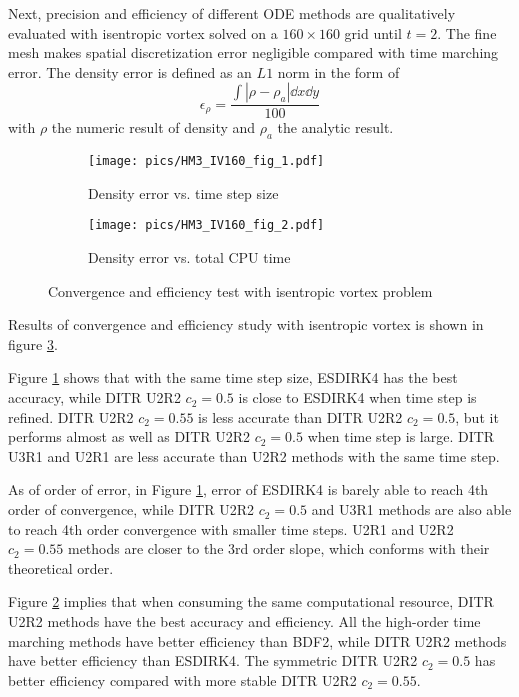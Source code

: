 Next, precision and efficiency of different ODE methods are
qualitatively evaluated with isentropic vortex solved on a $160\times160$
grid until $t=2$.
The fine mesh makes spatial
discretization error negligible compared with
time marching error.
The density error is defined as an $L1$ norm in the form of
\begin{equation}
    \epsilon_\rho = \frac{\int{|\rho-\rho_a| \dd x\dd y}}{
        100
    }
\end{equation}
with  $\rho$ the numeric result of density
and $\rho_a$ the analytic result.



\begin{figure}[htbp]
    \centering
    \begin{subfigure}{0.5\textwidth}
        \texttt{[image: pics/HM3\_IV160\_fig\_1.pdf]}
        \caption[]{Density error vs. time step size }
        \label{sfig:IVTests_Conv}
    \end{subfigure}\hfill
    \begin{subfigure}{0.5\textwidth}
        \texttt{[image: pics/HM3\_IV160\_fig\_2.pdf]}
        \caption[]{Density error vs. total CPU time}
        \label{sfig:IVTests_Eff}
    \end{subfigure}
    \caption[]{Convergence and efficiency test with isentropic vortex problem}
    \label{fig:IVTests}
\end{figure}

Results of convergence and efficiency study with isentropic vortex is
shown in figure \ref{fig:IVTests}.

Figure \ref{sfig:IVTests_Conv} shows that with the same time step size,
ESDIRK4 has the best accuracy, while DITR U2R2 $c_2=0.5$ is close to
ESDIRK4 when time step is refined. DITR U2R2 $c_2=0.55$ is less accurate
than DITR U2R2 $c_2=0.5$, but it performs almost as well as
DITR U2R2 $c_2=0.5$ when time step is large.
DITR U3R1 and U2R1 are less accurate than U2R2 methods with
the same time step.

As of order of error, in Figure \ref{sfig:IVTests_Conv},
error of ESDIRK4 is barely able to reach 4th order of convergence,
while DITR U2R2 $c_2=0.5$ and U3R1 methods are also able to reach
4th order convergence with smaller time steps. U2R1 and U2R2 $c_2=0.55$
methods are closer to the 3rd order slope, which conforms with
their theoretical order.

Figure \ref{sfig:IVTests_Eff}
implies that when consuming the same computational resource,
DITR U2R2 methods have the best accuracy and efficiency.
All the high-order
time marching methods have better efficiency than BDF2,
while DITR U2R2 methods have better efficiency than ESDIRK4.
The symmetric DITR U2R2 $c_2=0.5$ has better efficiency
compared with more stable DITR U2R2 $c_2=0.55$.


